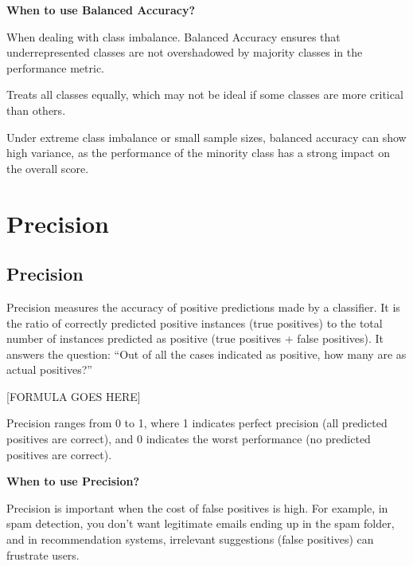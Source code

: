 \textbf{When to use Balanced Accuracy?}

When dealing with class imbalance. Balanced Accuracy ensures that underrepresented classes are not overshadowed by majority classes in the performance metric.

{
\item Treats all classes equally, which may not be ideal if some classes are more critical than others.
\item Under extreme class imbalance or small sample sizes, balanced accuracy can show high variance, as the performance of the minority class has a strong impact on the overall score.
}

\clearpage
\thispagestyle{classificationstyle}
\section{Precision}
\subsection{Precision}

Precision measures the accuracy of positive predictions made by a classifier. It is the ratio of correctly predicted positive instances (true positives) to
the total number of instances predicted as positive (true positives + false positives). It answers the question: “Out of all the cases indicated as positive, how many are as actual positives?”

\begin{center}
    [FORMULA GOES HERE]
\end{center}

Precision ranges from 0 to 1, where 1 indicates perfect precision (all predicted positives are correct), and 0 indicates the worst performance (no predicted positives are correct).

\textbf{When to use Precision?}

Precision is important when the cost of false positives is high. For example, in spam detection, you don’t want legitimate emails ending up in the spam folder,
and in recommendation systems, irrelevant suggestions (false positives) can frustrate users.

